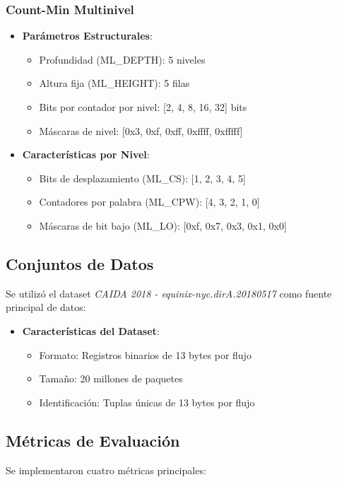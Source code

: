 \documentclass[a4paper,12pt]{article}
\begin{document}
\subsubsection{Count-Min Multinivel}
\begin{itemize}
    \item \textbf{Parámetros Estructurales}:
    \begin{itemize}
        \item Profundidad (ML\_DEPTH): 5 niveles
        \item Altura fija (ML\_HEIGHT): 5 filas
        \item Bits por contador por nivel: [2, 4, 8, 16, 32] bits
        \item Máscaras de nivel: [0x3, 0xf, 0xff, 0xffff, 0xfffff]
    \end{itemize}
    
    \item \textbf{Características por Nivel}:
    \begin{itemize}
        \item Bits de desplazamiento (ML\_CS): [1, 2, 3, 4, 5]
        \item Contadores por palabra (ML\_CPW): [4, 3, 2, 1, 0]
        \item Máscaras de bit bajo (ML\_LO): [0xf, 0x7, 0x3, 0x1, 0x0]
    \end{itemize}
\end{itemize}

\subsection{Conjuntos de Datos}
Se utilizó el dataset \textit{CAIDA 2018 - equinix-nyc.dirA.20180517} como fuente principal de datos:

\begin{itemize}
    \item \textbf{Características del Dataset}:
    \begin{itemize}
        \item Formato: Registros binarios de 13 bytes por flujo
        \item Tamaño: 20 millones de paquetes
        \item Identificación: Tuplas únicas de 13 bytes por flujo
    \end{itemize}
\end{itemize}

\subsection{Métricas de Evaluación}
Se implementaron cuatro métricas principales:
\end{document}
